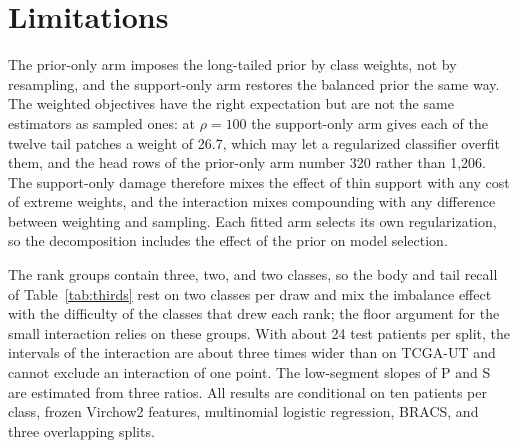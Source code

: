 \section{Limitations}
\label{sec:limitations}
The prior-only arm imposes the long-tailed prior by class weights, not by resampling, and the support-only arm restores the balanced prior the same way. The weighted objectives have the right expectation but are not the same estimators as sampled ones: at $\rho=100$ the support-only arm gives each of the twelve tail patches a weight of 26.7, which may let a regularized classifier overfit them, and the head rows of the prior-only arm number 320 rather than 1,206. The support-only damage therefore mixes the effect of thin support with any cost of extreme weights, and the interaction mixes compounding with any difference between weighting and sampling. Each fitted arm selects its own regularization, so the decomposition includes the effect of the prior on model selection.

The rank groups contain three, two, and two classes, so the body and tail recall of Table~\ref{tab:thirds} rest on two classes per draw and mix the imbalance effect with the difficulty of the classes that drew each rank; the floor argument for the small interaction relies on these groups. With about 24 test patients per split, the intervals of the interaction are about three times wider than on TCGA-UT and cannot exclude an interaction of one point. The low-segment slopes of P and S are estimated from three ratios. All results are conditional on ten patients per class, frozen Virchow2 features, multinomial logistic regression, BRACS, and three overlapping splits.
